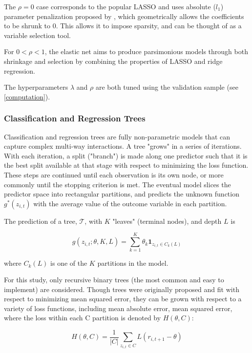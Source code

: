 \documentclass[11pt, a4paper, table]{article}
\begin{document}
The $\rho = 0$ case corresponds to the popular LASSO and uses absolute ($l_1$) parameter penalization proposed by \cite{tibshirani_regression_1996}, which geometrically allows the coefficients to be shrunk to 0. This allows it to impose sparsity, and can be thought of as a variable selection tool.

For \(0 < \rho < 1\), the elastic net aims to produce parsimonious models through both shrinkage and selection by combining the properties of LASSO and ridge regression.

The hyperparameters $\lambda$ and $\rho$ are both tuned using the validation sample (see \ref{computation}). 

\subsubsection{Classification and Regression Trees}

Classification and regression trees are fully non-parametric models that can capture complex multi-way interactions. A tree "grows" in a series of iterations. With each iteration, a split ("branch") is made along one predictor such that it is the best split available at that stage with respect to minimizing the loss function. These steps are continued until each observation is its own node, or more commonly until the stopping criterion is met. The eventual model slices the predictor space into rectangular partitions, and predicts the unknown function $g^*(z_{i,t})$ with the average value of the outcome variable in each partition.

The prediction of a tree, $\mathcal{T}$, with \(K\) "leaves" (terminal nodes), and depth $L$ is

\begin{equation}
	g(z_{i,t};\theta,K,L) = \sum_{k=1}^{K}\theta_k\textbf{1}_{z_{i,t}\in C_k(L)}
\end{equation}

where $C_k(L)$ is one of the $K$ partitions in the model.

For this study, only recursive binary trees (the most common and easy to implement) are considered. Though trees were originally proposed and fit with respect to minimizing mean squared error, they can be grown with respect to a variety of loss functions, including mean absolute error, mean squared error, where the loss within each C partition is denoted by $H(\theta, C)$:

\begin{equation}
	H(\theta, C) = \frac{1}{|C|} \sum_{z_{i,t} \in C} L(r_{i,t+1} - \theta)
\end{equation}
\end{document}
